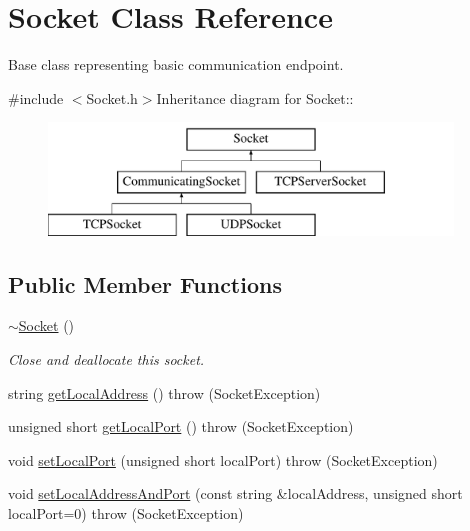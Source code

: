 \hypertarget{classSocket}{
\section{Socket Class Reference}
\label{classSocket}
}


Base class representing basic communication endpoint.  


{\ttfamily \#include $<$Socket.h$>$}Inheritance diagram for Socket::\begin{figure}[H]
\begin{center}
\leavevmode
\includegraphics[height=3cm]{classSocket}
\end{center}
\end{figure}
\subsection*{Public Member Functions}
\begin{DoxyCompactItemize}
\item 
\hypertarget{classSocket_aeac4eb6379a543d38ed88977d3b6630a}{
\hyperlink{classSocket_aeac4eb6379a543d38ed88977d3b6630a}{$\sim$Socket} ()}
\label{classSocket_aeac4eb6379a543d38ed88977d3b6630a}

\begin{DoxyCompactList}\small\item\em Close and deallocate this socket. \item\end{DoxyCompactList}\item 
string \hyperlink{classSocket_a0fca07bdfa97874fba1a17995ed7cda3}{getLocalAddress} ()  throw (SocketException)
\item 
unsigned short \hyperlink{classSocket_ae01143b667d69483a2f53d0f4ce7eeed}{getLocalPort} ()  throw (SocketException)
\item 
void \hyperlink{classSocket_a773fe4a35146002de76952e16fdebcfa}{setLocalPort} (unsigned short localPort)  throw (SocketException)
\item 
void \hyperlink{classSocket_aa6b986410bc2e606ba27d01fa7cb8836}{setLocalAddressAndPort} (const string \&localAddress, unsigned short localPort=0)  throw (SocketException)
\end{DoxyCompactItemize}
